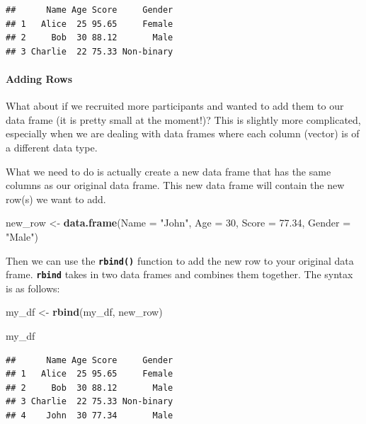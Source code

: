 \documentclass[
]{book}
\newenvironment{Shaded}{\begin{snugshade}}{\end{snugshade}}
\newcommand{\AttributeTok}[1]{\textcolor[rgb]{0.13,0.29,0.53}{#1}}
\newcommand{\DecValTok}[1]{\textcolor[rgb]{0.00,0.00,0.81}{#1}}
\newcommand{\FloatTok}[1]{\textcolor[rgb]{0.00,0.00,0.81}{#1}}
\newcommand{\FunctionTok}[1]{\textcolor[rgb]{0.13,0.29,0.53}{\textbf{#1}}}
\newcommand{\NormalTok}[1]{#1}
\newcommand{\OtherTok}[1]{\textcolor[rgb]{0.56,0.35,0.01}{#1}}
\newcommand{\StringTok}[1]{\textcolor[rgb]{0.31,0.60,0.02}{#1}}
\begin{document}
\begin{verbatim}
##      Name Age Score     Gender
## 1   Alice  25 95.65     Female
## 2     Bob  30 88.12       Male
## 3 Charlie  22 75.33 Non-binary
\end{verbatim}

\hypertarget{adding-rows}{%
\paragraph{Adding Rows}\label{adding-rows}}

What about if we recruited more participants and wanted to add them to our data frame (it is pretty small at the moment!)? This is slightly more complicated, especially when we are dealing with data frames where each column (vector) is of a different data type.

What we need to do is actually create a new data frame that has the same columns as our original data frame. This new data frame will contain the new row(s) we want to add.

\begin{Shaded}
\begin{Highlighting}[]
\NormalTok{new\_row }\OtherTok{\textless{}{-}} \FunctionTok{data.frame}\NormalTok{(}\AttributeTok{Name =} \StringTok{"John"}\NormalTok{, }\AttributeTok{Age =} \DecValTok{30}\NormalTok{, }\AttributeTok{Score =} \FloatTok{77.34}\NormalTok{, }\AttributeTok{Gender =} \StringTok{"Male"}\NormalTok{)}
\end{Highlighting}
\end{Shaded}

Then we can use the \textbf{\texttt{rbind()}} function to add the new row to your original data frame. \textbf{\texttt{rbind}} takes in two data frames and combines them together. The syntax is as follows:

\begin{Shaded}
\begin{Highlighting}[]
\NormalTok{my\_df }\OtherTok{\textless{}{-}} \FunctionTok{rbind}\NormalTok{(my\_df, new\_row)}

\NormalTok{my\_df}
\end{Highlighting}
\end{Shaded}

\begin{verbatim}
##      Name Age Score     Gender
## 1   Alice  25 95.65     Female
## 2     Bob  30 88.12       Male
## 3 Charlie  22 75.33 Non-binary
## 4    John  30 77.34       Male
\end{verbatim}
\end{document}
